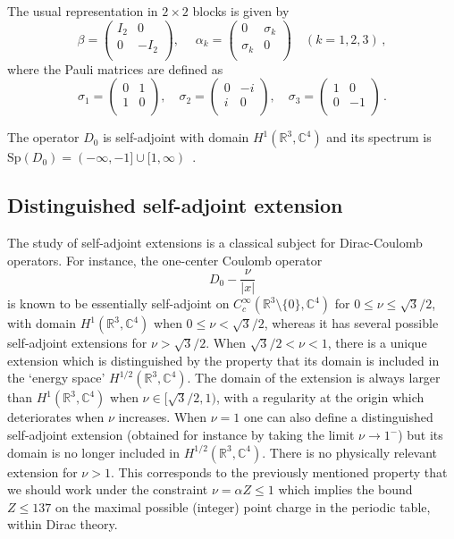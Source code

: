 \documentclass[AHL,Unicode,published]{cedram}
\newcommand{\R}{\mathbb{R}}
\newcommand{\C}{\mathbb{C}}
\newcommand{\Spec}{\mathrm{Sp}}
\newcommand\1{{\ensuremath {\mathds 1} }}
\newcommand{\ii}{\infty}
\renewcommand{\leq}{\leqslant}
\begin{document}
\noindent The usual representation in $2\times 2$ blocks is given by
\[
\beta=
\begin{pmatrix} I_2 & 0 \\ 0 & -I_2 \\
\end{pmatrix},\quad \; \alpha_k=
\begin{pmatrix}
0 &\sigma_k \\ \sigma_k &0 \\
\end{pmatrix} \quad (k=1, 2, 3)\,,
\]
where the Pauli matrices are defined as
\[
\sigma _1=
\begin{pmatrix} 0 & 1
\\ 1 & 0 \\
\end{pmatrix},\quad \sigma_2=
\begin{pmatrix} 0 & -i \\
i & 0 \\
\end{pmatrix},\quad \sigma_3=
\begin{pmatrix} 1 & 0\\ 0 &-1\\
\end{pmatrix} \,.
\]

The operator $D_0$ is self-adjoint with domain $H^1(\R^3,\C^4)$ and its spectrum is $\Spec(D_0)=(-\ii,-1]\cup[1,\ii)$~\cite{Thaller}.

\subsection{Distinguished self-adjoint extension} The study of self-adjoint extensions is a classical subject for Dirac-Coulomb operators. For instance, the one-center Coulomb operator
\[
D_0-\frac{\nu}{|x|}
\]
is known to be essentially self-adjoint on $C^\ii_c(\R^3\setminus\{0\},\C^4)$ for $0\leq \nu\leq\sqrt3/2$, with domain $H^1(\R^3,\C^4)$ when $0\leq\nu<\sqrt{3}/2$, whereas it has several possible self-adjoint extensions for $\nu>\sqrt3/2$. When $\sqrt3/2<\nu<1$, there is a unique extension which is distinguished by the property that its domain is included in the `energy space' $H^{1/2}(\R^3,\C^4)$. The domain of the extension is always larger than $H^1(\R^3,\C^4)$ when $\nu\in[\sqrt3/2,1)$, with a regularity at the origin which deteriorates when $\nu$ increases. When $\nu=1$ one can also define a distinguished self-adjoint extension (obtained for instance by taking the limit $\nu\to1^-$) but its domain is no longer included in $H^{1/2}(\R^3,\C^4)$. There is no physically relevant extension for $\nu>1$. This corresponds to the previously mentioned property that we should work under the constraint $\nu=\alpha Z\le1$ which implies the bound $Z\leq 137$ on the maximal possible (integer) point charge in the periodic table, within Dirac theory.
\end{document}
